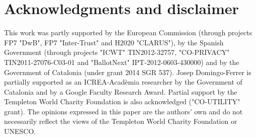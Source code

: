 \documentclass[10pt,journal,compsoc]{IEEEtran}
\theoremstyle{definition}
\theoremstyle{plain}
\begin{document}
\section*{Acknowledgments and disclaimer}

This work was partly supported by the European Commission 
(through projects FP7 "DwB", FP7 "Inter-Trust" and H2020 "CLARUS"), 
by the Spanish Government (through projects "ICWT" TIN2012-32757, 
"CO-PRIVACY" TIN2011-27076-C03-01 and "BallotNext" IPT-2012-0603-430000) 
and by the Government of Catalonia (under grant 2014 SGR 537). 
Josep Domingo-Ferrer is partially supported as an ICREA-Acad\`emia 
researcher by the Government of Catalonia and 
by a Google Faculty Research Award. 
Partial support by the  
Templeton World Charity Foundation is 
also acknowledged ("CO-UTILITY" grant).
The opinions expressed in this paper 
are the authors' own and do not necessarily reflect the views of the 
Templeton World Charity Foundation or UNESCO.


\ifCLASSOPTIONcaptionsoff
  \newpage
\fi
\end{document}
